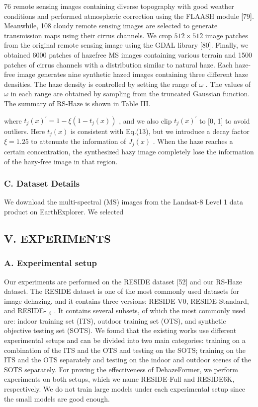 76 remote sensing images containing diverse topography with good weather conditions and performed atmospheric correction using the FLAASH module [79]. Meanwhile, 108 cloudy remote sensing images are selected to generate transmission maps using their cirrus channels. We crop $512\times512$ image patches from the original remote sensing image using the GDAL library [80]. Finally, we obtained 6000 patches of hazefree MS images containing various terrain and 1500 patches of cirrus channels with a distribution similar to natural haze. Each haze-free image generates nine synthetic hazed images containing three different haze densities. The haze density is controlled by setting the range of $\omega$ . The values of $\omega$ in each range are obtained by sampling from the truncated Gaussian function. The summary of RS-Haze is shown in Table III.

where $t_{j}(x)^{\prime}=1-\xi(1-t_{j}(x))$ , and we also clip $t_{j}(x)^{\prime}$ to [0, 1] to avoid outliers. Here $t_{j}(x)$ is consistent with Eq.(13), but we introduce a decay factor $\xi=1.25$ to attenuate the information of $J_{j}(x)$ . When the haze reaches a certain concentration, the synthesized hazy image completely lose the information of the hazy-free image in that region.

\subsubsection{C. Dataset Details}

We download the multi-spectral (MS) images from the Landsat-8 Level 1 data product on EarthExplorer. We selected

\subsection{V. EXPERIMENTS}

\subsubsection{A. Experimental setup}

Our experiments are performed on the RESIDE dataset [52] and our RS-Haze dataset. The RESIDE dataset is one of the most commonly used datasets for image dehazing, and it contains three versions: RESIDE-V0, RESIDE-Standard, and RESIDE- $_{\beta}$ . It contains several subsets, of which the most commonly used are: indoor training set (ITS), outdoor training set (OTS), and synthetic objective testing set (SOTS). We found that the existing works use different experimental setups and can be divided into two main categories: training on a combination of the ITS and the OTS and testing on the SOTS; training on the ITS and the OTS separately and testing on the indoor and outdoor scenes of the SOTS separately. For proving the effectiveness of DehazeFormer, we perform experiments on both setups, which we name RESIDE-Full and RESIDE6K, respectively. We do not train large models under each experimental setup since the small models are good enough.

